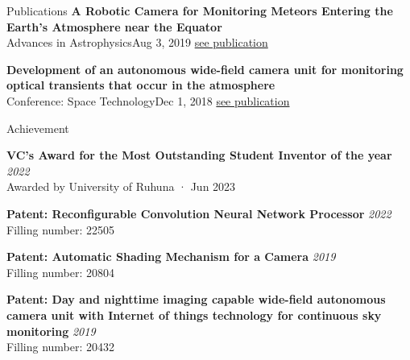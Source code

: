 \documentclass[
	11pt, %
]{./../assets/resume} %
\begin{document}
\begin{rSection}{Publications}
	\textbf{A Robotic Camera for Monitoring Meteors Entering the Earth’s Atmosphere near the Equator} \\
	{Advances in Astrophysics}{Aug 3, 2019}
	\href{http://www.isaacpub.org/images/PaperPDF/AdAp_100132_2019082716321960559.pdf}{see publication}

	\textbf{Development of an autonomous wide-field camera unit for monitoring optical transients that occur in the atmosphere} \\
	{Conference: Space Technology}{Dec 1, 2018}
	\href{https://www.researchgate.net/publication/332246125_Development_of_an_autonomous_wide-field_camera_unit_for_monitoring_optical_transients_that_occur_in_the_atmosphere}{see publication}

\end{rSection}

\pagebreak







\begin{rSection}{Achievement}

	\textbf{VC's Award for the Most Outstanding Student Inventor of the year} \hfill \textit{2022} \\
	Awarded by University of Ruhuna · Jun 2023

	\textbf{Patent: Reconfigurable Convolution Neural Network Processor} \hfill \textit{2022} \\ 
	Filling number: 22505

	\textbf{Patent: Automatic Shading Mechanism for a Camera} \hfill \textit{2019} \\ 
	Filling number: 20804

	\textbf{Patent: Day and nighttime imaging capable wide-field autonomous camera unit with Internet of things technology for continuous sky monitoring} \hfill \textit{2019} \\ 
	Filling number: 20432



\end{rSection}
\end{document}
